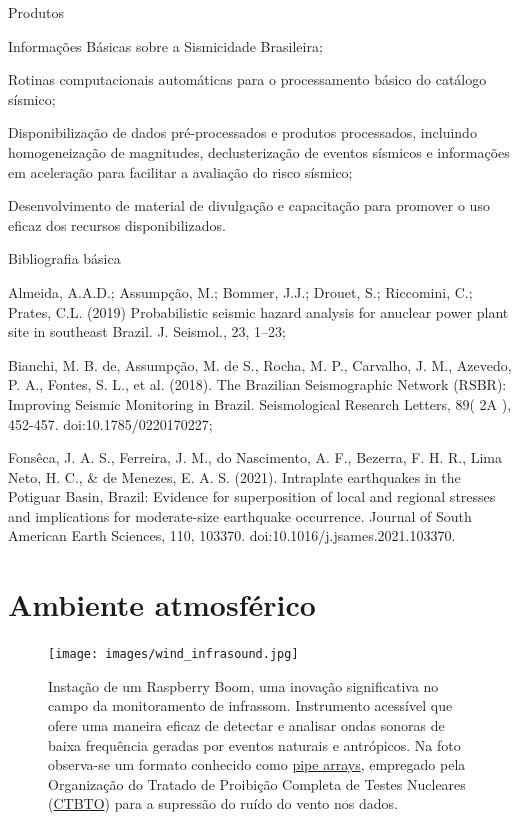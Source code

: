 \documentclass[10pt,a4paper,oneside]{book}
\newcommand{\HeroFigPad}{\vspace{-1cm}}
\begin{document}
\begin{fancyenum}{\faShoppingCart}{Produtos}
	\item Informações Básicas sobre a Sismicidade Brasileira;
	\item Rotinas computacionais automáticas para o processamento básico do catálogo sísmico;	
	\item Disponibilização de dados pré-processados e produtos processados, incluindo homogeneização de magnitudes, declusterização de eventos sísmicos e informações em aceleração para facilitar a avaliação do risco sísmico;
	\item Desenvolvimento de material de divulgação e capacitação para promover o uso eficaz dos recursos disponibilizados.
\end{fancyenum}

\begin{fancyenum}{\faBook}{Bibliografia básica}
	\item Almeida, A.A.D.; Assumpção, M.; Bommer, J.J.; Drouet, S.; Riccomini, C.; Prates, C.L. (2019) Probabilistic seismic hazard analysis for anuclear power plant site in southeast Brazil. J. Seismol., 23, 1–23;
	\item Bianchi, M. B. de, Assumpção, M. de S., Rocha, M. P., Carvalho, J. M., Azevedo, P. A., Fontes, S. L., et al. (2018). The Brazilian Seismographic Network (RSBR): Improving Seismic Monitoring in Brazil. Seismological Research Letters, 89( 2A ), 452-457. doi:10.1785/0220170227;
	\item Fonsêca, J. A. S., Ferreira, J. M., do Nascimento, A. F., Bezerra, F. H. R., Lima Neto, H. C., \& de Menezes, E. A. S. (2021). Intraplate earthquakes in the Potiguar Basin, Brazil: Evidence for superposition of local and regional stresses and implications for moderate-size earthquake occurrence. Journal of South American Earth Sciences, 110, 103370. doi:10.1016/j.jsames.2021.103370. 
\end{fancyenum}


\chapter{Ambiente atmosférico}
\label{cap_ceu}

\begin{figure}[h]
	\HeroFigPad
	\begin{center}
		\texttt{[image: images/wind\_infrasound.jpg]}
	\end{center}
	\caption{
	Instação de um Raspberry Boom, uma inovação significativa no campo da monitoramento de infrassom. Instrumento acessível que ofere uma maneira eficaz de detectar e analisar ondas sonoras de baixa frequência geradas por eventos naturais e antrópicos. Na foto observa-se um formato conhecido como \href{https://www.ctbto.org/our-work/monitoring-technologies/infrasound-monitoring}{pipe arrays}, empregado pela Organização do Tratado de Proibição Completa de Testes Nucleares (\href{https://www.ctbto.org/}{CTBTO}) para a supressão do ruído do vento nos dados.
    }
 \label{fig_wind}
\end{figure}
\end{document}
